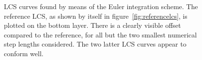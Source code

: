 \begin{figure}[htpb]
    \centering
    
    \caption[LCS curves found by means of the Euler integration scheme]{
        LCS curves found by means of the Euler integration scheme. The
        reference LCS, as shown by itself in figure~\ref{fig:referencelcs},
        is plotted on the bottom layer. There is a clearly visible offset
        compared to the reference, for all but the two smallest numerical step
        lengths considered. The two latter LCS curves appear to conform well.}
    \label{fig:lcs_euler}
\end{figure}
